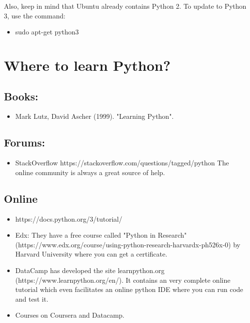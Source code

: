 \documentclass[11pt]{article}
\providecommand{\tightlist}{%
      \setlength{\itemsep}{0pt}\setlength{\parskip}{0pt}}
\begin{document}
Also, keep in mind that Ubuntu already contains Python 2. To update to
Python 3, use the command:

\begin{itemize}
\tightlist
\item
  sudo apt-get python3
\end{itemize}

    \section{Where to learn Python?}\label{where-to-learn-python}

    \subsection{Books:}\label{books}

\begin{itemize}
\tightlist
\item
  Mark Lutz, David Ascher (1999). "Learning Python".
\end{itemize}

    \subsection{Forums:}\label{forums}

\begin{itemize}
\tightlist
\item
  StackOverflow https://stackoverflow.com/questions/tagged/python The
  online community is always a great source of help.
\end{itemize}

    \subsection{Online}\label{online}

\begin{itemize}
\tightlist
\item
  https://docs.python.org/3/tutorial/
\item
  Edx: They have a free course called "Python in Research"
  (https://www.edx.org/course/using-python-research-harvardx-ph526x-0)
  by Harvard University where you can get a certificate.
\item
  DataCamp has developed the site learnpython.org
  (https://www.learnpython.org/en/). It contains an very complete online
  tutorial which even facilitates an online python IDE where you can run
  code and test it.
\item
  Courses on Coursera and Datacamp.
\end{itemize}
\end{document}
